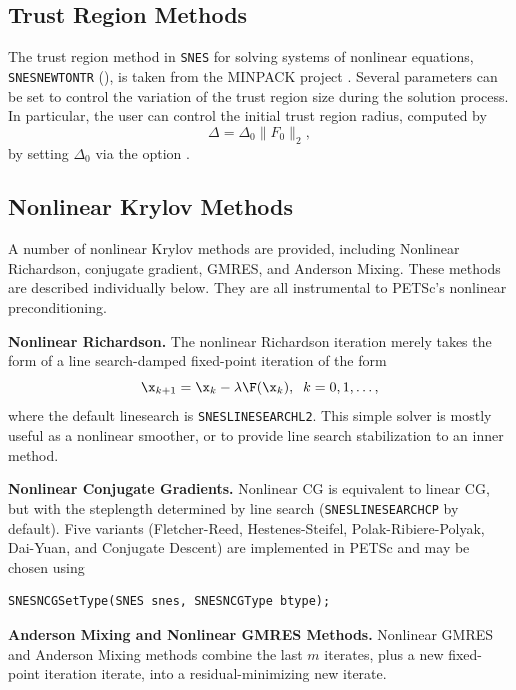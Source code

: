 \subsection{Trust Region Methods}

The trust region method in \lstinline{SNES} for solving systems of nonlinear
equations, \lstinline{SNESNEWTONTR} \break(), is taken from
the MINPACK project \cite{more84}. Several parameters can be set to
control the variation of the trust region size during the solution
process.  In particular, the user can control the initial trust region
radius, computed by
\[
  \Delta = \Delta_0 \| F_0 \|_2,
\]
by setting $ \Delta_0 $ via the option
.

\subsection{Nonlinear Krylov Methods}

A number of nonlinear Krylov methods are provided, including Nonlinear Richardson, conjugate gradient, GMRES, and
Anderson Mixing.  These methods are described individually below.  They are all instrumental to PETSc's nonlinear
preconditioning.

\textbf{Nonlinear Richardson.}
The nonlinear Richardson iteration merely takes the form of a line search-damped fixed-point iteration of the form
\begin{equation}
     \x_{k+1} = \x_k - \lambda \F(\x_k), \;\; k=0,1, \ldots,
\label{eq_nrich}
\end{equation}
\noindent where the default linesearch is \lstinline{SNESLINESEARCHL2}.  This simple solver is mostly useful as a nonlinear smoother, or to
provide line search stabilization to an inner method.

\textbf{Nonlinear Conjugate Gradients.}
Nonlinear CG is equivalent to linear CG, but with the steplength determined by line search (\lstinline{SNESLINESEARCHCP} by
default).  Five variants (Fletcher-Reed, Hestenes-Steifel, Polak-Ribiere-Polyak, Dai-Yuan, and Conjugate Descent) are
implemented in PETSc and may be chosen using
\begin{lstlisting}
SNESNCGSetType(SNES snes, SNESNCGType btype);
\end{lstlisting}

\textbf{Anderson Mixing and Nonlinear GMRES Methods.}
Nonlinear GMRES and Anderson Mixing methods combine the last $m$ iterates, plus a new fixed-point iteration iterate,
into a residual-minimizing new iterate.

